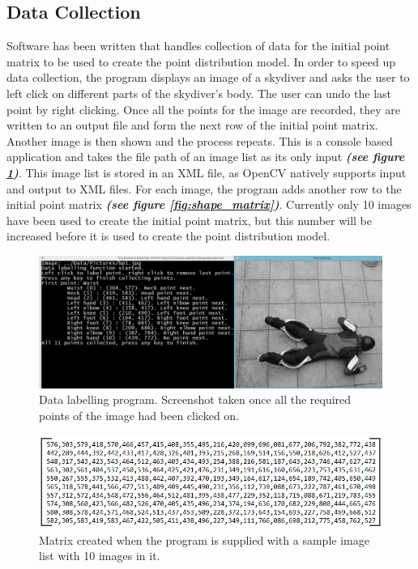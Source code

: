 \documentclass[a4paper, 12pt]{article}
\begin{document}
	\subsection{Data Collection}
	Software has been written that handles collection of data for the initial point 			matrix to be used to create the point distribution model. In order to speed up data collection, the program displays an image of a skydiver and asks the user to left click on different parts of the skydiver's body. The user can undo the last point by right clicking. Once all the points for the image are recorded, they are written to an output file and form the next row of the initial point matrix. Another image is then shown and the process repeats. This is a console based application and takes the file path of an image list as its only input \textbf{\emph{(see figure \ref{fig:data_collection})}}. This image list is stored in an XML file, as OpenCV natively supports input and output to XML files. For each image, the program adds another row to the initial point matrix \textbf{\emph{(see figure \ref{fig:shape_matrix})}}. Currently only 10 images have been used to create the initial point matrix, but this number will be increased before it is used to create the point distribution model.
%
\begin{figure}[H]
	\centering
	\includegraphics[width=\linewidth]{data_collection.png}
	\caption{Data labelling program. Screenshot taken once all the required points of the image had been clicked on.}
	\label{fig:data_collection}
\end{figure}
%
\begin{figure}[H]
	\centering
	\includegraphics[width=\linewidth]{initial_matrix.png}
	\caption{Matrix created when the program is supplied with a sample image list with 10 images in it.}
	\label{fig:initial_matrix}
\end{figure}
%
\end{document}
